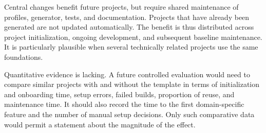 Central changes benefit future projects, but require shared
maintenance of profiles, generator, tests, and documentation. Projects that
have already been generated are not updated automatically.
The benefit is thus distributed across project initialization, ongoing
development, and subsequent baseline maintenance. It is particularly plausible
when several technically related projects use the same foundations.

Quantitative evidence is lacking. A future controlled evaluation would need to
compare similar projects with and without the template in terms of
initialization and onboarding time, setup errors, failed builds, proportion of
reuse, and maintenance time.
It should also record the time to the first domain-specific feature and the
number of manual setup decisions. Only such comparative data would permit a
statement about the magnitude of the effect.
